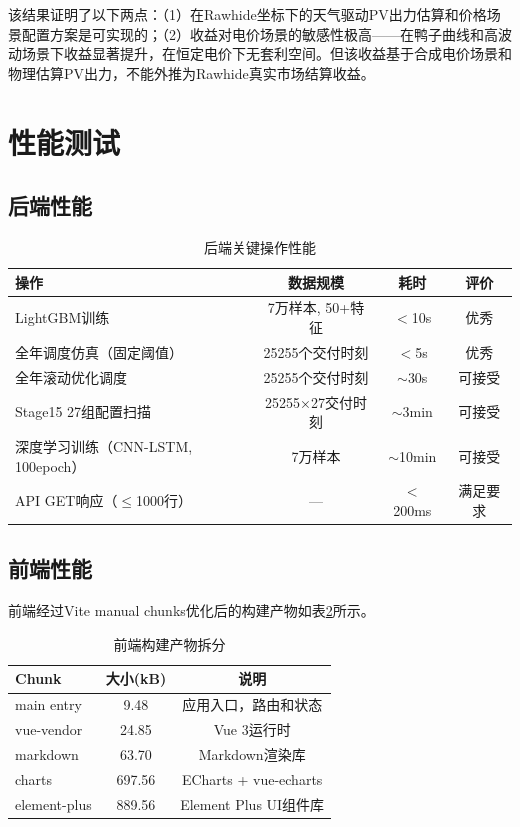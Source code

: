 \documentclass[12pt,a4paper]{ctexbook}
\begin{document}
该结果证明了以下两点：（1）在Rawhide坐标下的天气驱动PV出力估算和价格场景配置方案是可实现的；（2）收益对电价场景的敏感性极高——在鸭子曲线和高波动场景下收益显著提升，在恒定电价下无套利空间。但该收益基于合成电价场景和物理估算PV出力，不能外推为Rawhide真实市场结算收益。

\section{性能测试}

\subsection{后端性能}

\begin{table}[H]
\centering
\caption{后端关键操作性能}
\label{tab:perf-backend}
\begin{tabular}{@{}lccc@{}}
\toprule
\textbf{操作} & \textbf{数据规模} & \textbf{耗时} & \textbf{评价} \\
\midrule
LightGBM训练 & 7万样本, 50+特征 & $<$10s & 优秀 \\
全年调度仿真（固定阈值） & 25255个交付时刻 & $<$5s & 优秀 \\
全年滚动优化调度 & 25255个交付时刻 & $\sim$30s & 可接受 \\
Stage15 27组配置扫描 & 25255×27交付时刻 & $\sim$3min & 可接受 \\
深度学习训练（CNN-LSTM, 100epoch） & 7万样本 & $\sim$10min & 可接受 \\
API GET响应（$\le$1000行） & — & $<$200ms & 满足要求 \\
\bottomrule
\end{tabular}
\end{table}

\subsection{前端性能}

前端经过Vite manual chunks优化后的构建产物如表\ref{tab:perf-frontend}所示。

\begin{table}[H]
\centering
\caption{前端构建产物拆分}
\label{tab:perf-frontend}
\begin{tabular}{@{}lcc@{}}
\toprule
\textbf{Chunk} & \textbf{大小(kB)} & \textbf{说明} \\
\midrule
main entry & 9.48 & 应用入口，路由和状态 \\
vue-vendor & 24.85 & Vue 3运行时 \\
markdown & 63.70 & Markdown渲染库 \\
charts & 697.56 & ECharts + vue-echarts \\
element-plus & 889.56 & Element Plus UI组件库 \\
\bottomrule
\end{tabular}
\end{table}
\end{document}
